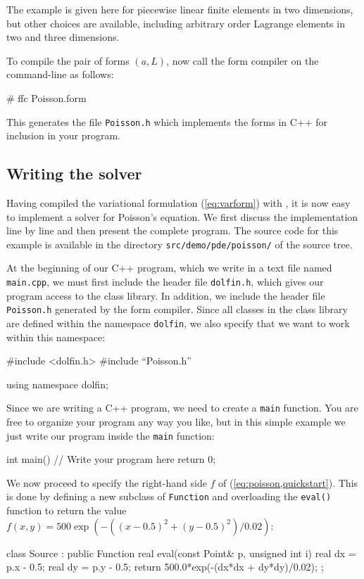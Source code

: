 The example is given here for piecewise linear finite elements in two
dimensions, but other choices are available, including arbitrary order
Lagrange elements in two and three dimensions.

To compile the pair of forms $(a, L)$, now call the form compiler on
the command-line as follows:
\begin{code}
# ffc Poisson.form
\end{code}
This generates the file \texttt{Poisson.h} which implements the forms
in C++ for inclusion in your \dolfin{} program.

\subsection{Writing the solver}

Having compiled the variational formulation (\ref{eq:varform})
with \ffc{}, it is now easy to implement a solver for Poisson's
equation. We first discuss the implementation line by line and then
present the complete program. The source code for this example is
available in the directory \texttt{src/demo/pde/poisson/} of the \dolfin{}
source tree.

At the beginning of our C++ program, which we write in a text file
named \texttt{main.cpp}, we must first include the header file
\texttt{dolfin.h}, which gives our program access to the \dolfin{}
class library. In addition, we include the header file
\texttt{Poisson.h} generated by the form compiler. Since all classes
in the \dolfin{} class library are defined within the namespace
\texttt{dolfin}, we also specify that we want to work within this
namespace:
\begin{code}
#include <dolfin.h>
#include ``Poisson.h''
  
using namespace dolfin;
\end{code}

Since we are writing a C++ program, we need to create a \texttt{main}
function.  You are free to organize your program any way you like, but
in this simple example we just write our program inside the
\texttt{main} function:

\begin{code}
int main()
{
  // Write your program here
  return 0;
}
\end{code}

We now proceed to specify the right-hand side $f$ of (\ref{eq:poisson,quickstart}).
This is done by defining a new subclass of \texttt{Function}
and overloading the \texttt{eval()}
function to return the value $f(x, y) = 500 \exp(-((x-0.5)^2 +
(y-0.5)^2)/0.02)$:
\begin{code}
class Source : public Function
{
  real eval(const Point& p, unsigned int i)
  {
    real dx = p.x - 0.5;
    real dy = p.y - 0.5;
    return 500.0*exp(-(dx*dx + dy*dy)/0.02);
  }
};
\end{code}

